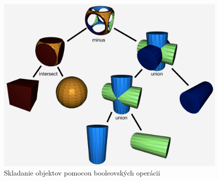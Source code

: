 \begin{figure}[H]
	\centering
	\includegraphics[width=\textwidth]{obrazky-figures/cube-sphere-cylinders-csg-tree.jpg}
	\caption{Skladanie objektov pomocou booleovských operácii}
	\label{fig:BooleanOperation}
\end{figure}





















































